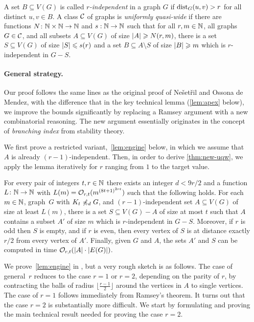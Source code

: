 A set $B\subseteq V(G)$ is called {\em{$r$-independent}} in a graph $G$ if  $\mathrm{dist}_G(u,v)>r$ for all
distinct $u,v\in B$.
A class $\mathcal{C}$ of graphs is \emph{uniformly quasi-wide} if there are
functions $N\colon \mathbb{N}\times\mathbb{N}\rightarrow \mathbb{N}$ and $s:\mathbb{N}\rightarrow \mathbb{N}$ such
that for all $r,m\in \mathbb{N}$, all graphs $G\in \mathcal{C}$, and all subsets $A\subseteq V(G)$ of size $\left\lvert A\right\rvert\geqslant N(r,m)$, there is a set
$S\subseteq V(G)$ of size $\left\lvert S\right\rvert\leqslant s(r)$ and a set
$B\subseteq A\setminus S$ of size $\left\lvert B\right\rvert\geqslant m$ which is $r$-independent in
$G-S$. 

\paragraph{General strategy.}
Our proof follows the same lines as the original proof of Ne\v set\v ril and Ossona de Mendez, with the difference that in the key technical lemma (\cref{lem:apex} below), 
we improve the bounds significantly by replacing a Ramsey argument with a new combinatorial reasoning.
The new argument essentially originates in the concept of {\em{branching index}} from stability theory. 

We first prove a restricted variant,~\cref{lem:engine} below, in which we assume that $A$ is already $(r-1)$-independent. Then, in order to derive
\cref{thm:new-uqw}, we apply the lemma iteratively for $r$ ranging from $1$ to the target value.

\begin{lemma}\label{lem:engine}
For every pair of integers $t,r\in \mathbb{N}$ there exists an integer $d<9r/2$ and a function $L\colon \mathbb{N}\to \mathbb{N}$ with $L(m)=\mathcal{O}_{r,t}{(m^{{(8t+1)}^{2rt}})}$ such that the following holds.
For each $m\in \mathbb{N}$, graph~$G$ with $K_t\not\preccurlyeq_{d} G$, and
$(r-1)$-independent set $A\subseteq V(G)$ of size at least $L(m)$, there is a set $S\subseteq V(G)-A$ of size at most $t$ such that $A$ contains a subset $A'$ of size $m$ which is $r$-independent in $G-S$.
Moreover, if $r$ is odd then $S$ is empty, and if $r$ is even,
then every vertex of $S$ is at distance exactly $r/2$ from every vertex of $A'$.
Finally, given $G$ and $A$, the sets $A'$ and $S$ can be computed in time $\mathcal{O}_{r,t}(|A|\cdot |E(G)|)$.
\end{lemma}

We prove~\cref{lem:engine} in , but  a very rough sketch is as follows.
The  case of general~$r$ reduces to the case $r=1$ or $r=2$, depending on the parity of $r$,
by contracting the balls of radius $\lfloor \frac {r-1} 2\rfloor $ around the vertices in $A$ to single vertices.
The case of $r=1$ follows immediately from Ramsey's theorem. 
It turns out that the case $r=2$ is substantially more difficult.
We start by formulating and proving the main technical result needed for proving the case $r=2$.

